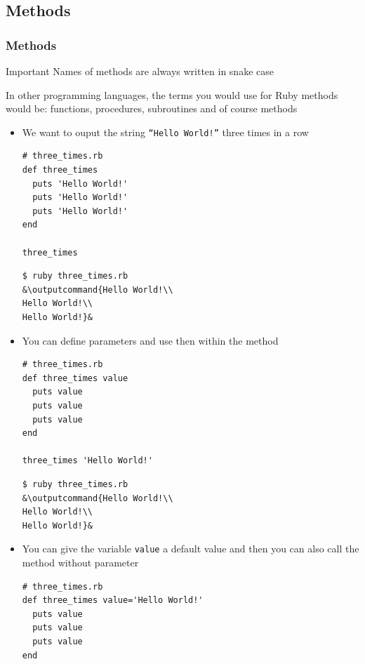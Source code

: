 \documentclass{beamer}
\newcommand{\outputcommand}[1]{\color{darkgreen}{#1}}
\begin{document}
\subsection{Methods}
\begin{frame}
\frametitle{Methods}
\begin{block}{Important}
\alert{Names of methods are always written in snake case}
\end{block}

In other programming languages, the terms you would use for Ruby methods would be: functions, procedures, subroutines and of course methods

\begin{itemize}

\item We want to ouput the string \texttt{``Hello World!''} three times in a row
\lstset{language=Ruby, style=eclipse}
\begin{lstlisting}[escapechar=&]
# three_times.rb
def three_times
  puts 'Hello World!'
  puts 'Hello World!'
  puts 'Hello World!'
end

three_times
\end{lstlisting}


\lstset{language=shell}
\begin{lstlisting}[numbers=none, escapechar=&]
$ ruby three_times.rb
&\outputcommand{Hello World!\\
Hello World!\\
Hello World!}&
\end{lstlisting}

\item You can define parameters and use then within the method

\lstset{language=Ruby, style=eclipse}
\begin{lstlisting}[escapechar=&]
# three_times.rb
def three_times value
  puts value
  puts value
  puts value
end

three_times 'Hello World!'
\end{lstlisting}


\lstset{language=shell}
\begin{lstlisting}[numbers=none, escapechar=&]
$ ruby three_times.rb
&\outputcommand{Hello World!\\
Hello World!\\
Hello World!}&
\end{lstlisting}

\item You can give the variable \texttt{value} a default value and then you can also call the method without parameter
\lstset{language=Ruby, style=eclipse}
\begin{lstlisting}[escapechar=&]
# three_times.rb
def three_times value='Hello World!'
  puts value
  puts value
  puts value
end


\end{lstlisting}
\end{itemize}
\end{frame}
\end{document}
